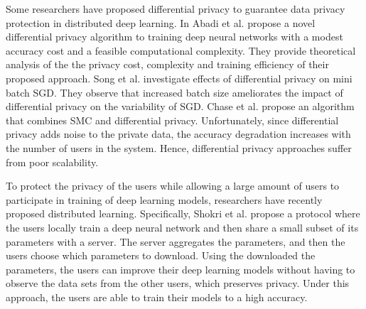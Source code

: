 \documentclass[conference]{IEEEtran}
\begin{document}

Some researchers have proposed differential privacy to guarantee data privacy protection in distributed deep learning. In 
Abadi et al. \cite{abadi2016deep} propose a novel differential privacy algorithm to training deep neural networks with a modest
accuracy cost and a feasible computational complexity. They provide theoretical analysis of the the privacy cost, complexity and
training efficiency of their proposed approach. 
Song et al. \cite{song2013stochastic} investigate effects of differential privacy on mini batch SGD. They observe that increased batch
size ameliorates the impact of differential privacy on the variability of SGD. 
Chase et al. \cite{chase2017private} propose an algorithm that combines  SMC and differential privacy. 
Unfortunately, since differential privacy adds noise to the private data, the accuracy degradation increases with the number of users
in the system. Hence, differential privacy approaches suffer from poor scalability. 

To protect the privacy of the users while allowing a large amount of users to participate in training of deep learning
models, researchers have recently proposed distributed learning. Specifically, Shokri et al. \cite{shokri2015privacy} propose 
a protocol where the users locally train a deep neural network and then share a small subset of its parameters
with a server. The server aggregates the parameters, and then the users choose which parameters to download. 
Using the downloaded the parameters, the users can improve their deep learning models without having to observe the data sets from the
other users, which preserves privacy. Under this approach, the users are able to train their models to a high accuracy. 
\end{document}
